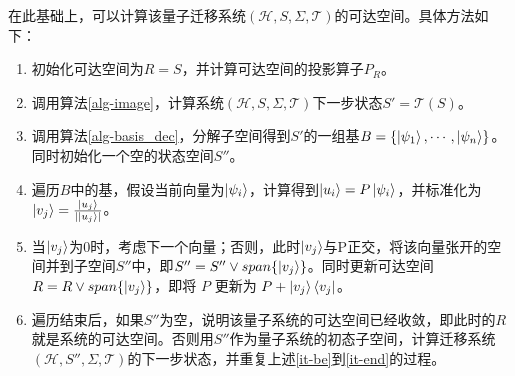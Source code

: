 在此基础上，可以计算该量子迁移系统$(\mathcal{H},S,\Sigma,\mathcal{T})$的可达空间。具体方法如下：
\begin{enumerate}
    \item 初始化可达空间为\(R = S\)，并计算可达空间的投影算子\(P_{R}\)。
    \item 调用算法\ref{alg-image}，计算系统$(\mathcal{H},S,\Sigma,\mathcal{T})$下一步状态\(S'=\mathcal{T}(S)\)。
    \item \label{it-be}调用算法\ref{alg-basis_dec}，分解子空间得到\(S'\)的一组基\(B = \{\ket{\psi_{1}},\cdots,\ket{\psi_{n}}\}\)。同时初始化一个空的状态空间$S''$。
    \item 遍历\(B\)中的基，假设当前向量为\(\ket{\psi_{i}}\)，计算得到\(\ket{u_i}=P\ket{\psi_{i}}\)，并标准化为$\ket{v_j}=\frac{\ket{u_j}}{|\ket{u_j}|}$。
    \item \label{it-end}当$\ket{v_j}$为0时，考虑下一个向量；否则，此时$\ket{v_j}$与P正交，将该向量张开的空间并到子空间$S''$中，即$S''=S''\vee span\{\ket{v_j}\}$。同时更新可达空间$R=R\vee span\{\ket{v_j}\}$，即将 $P$ 更新为 $P+\ket{v_j}\bra{v_j}$。
    \item 遍历结束后，如果$S''$为空，说明该量子系统的可达空间已经收敛，即此时的$R$就是系统的可达空间。否则用$S''$作为量子系统的初态子空间，计算迁移系统$(\mathcal{H},S'',\Sigma,\mathcal{T})$的下一步状态，并重复上述\ref{it-be}到\ref{it-end}的过程。
\end{enumerate}

